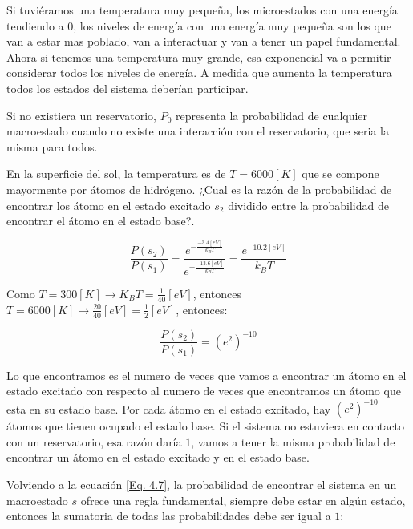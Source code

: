 \documentclass[11pt,fleqn]{book}
\begin{document}
\begin{example}
 Si tuviéramos una temperatura muy pequeña, los microestados con una energía tendiendo a $0$, los niveles de energía con una energía muy pequeña son los que van a estar mas poblado, van a interactuar y van a tener un papel fundamental. Ahora si tenemos una temperatura muy grande, esa exponencial va a permitir considerar todos los niveles de energía. A medida que aumenta la temperatura todos los estados del sistema deberían participar.
\end{example}

Si no existiera un reservatorio, $P_{0}$ representa la probabilidad de cualquier macroestado cuando no existe una interacción con el reservatorio, que seria la misma para todos. 

\begin{example}

En la superficie del sol, la temperatura es de $T=6000[K]$ que se compone mayormente por átomos de hidrógeno. ¿Cual es la razón de la probabilidad de encontrar los átomo en el estado excitado $s_{2}$ dividido entre la probabilidad de encontrar el átomo en el estado base?.

\begin{equation*}
    \frac{P(s_{2})}{P(s_{1})}=\frac{e^{-\frac{-3.4 [eV]}{k_{B}T}}}{e^{-\frac{-13.6 [eV]}{k_{B}T}}}=\frac{e^{-10.2 [eV]}}{k_{B}T}
\end{equation*}

Como $T=300[K]\longrightarrow K_{B}T=\frac{1}{40}[eV]$, entonces $T=6000 [K]\longrightarrow\frac{20}{40}[eV]=\frac{1}{2}[eV]$, entonces:

\begin{equation*}
    \frac{P(s_{2})}{P(s_{1})}=(e^{2})^{-10}
\end{equation*}

Lo que encontramos es el numero de veces que vamos a encontrar un átomo en el estado excitado con respecto al numero de veces que encontramos un átomo que esta en su estado base. Por cada átomo en el estado excitado, hay $(e^{2})^{-10}$ átomos que tienen ocupado el estado base. Si el sistema no estuviera en contacto con un reservatorio, esa razón daría $1$, vamos a tener la misma probabilidad de encontrar un átomo en el estado excitado y en el estado base.
\end{example}

Volviendo a la ecuación \ref{Eq. 4.7}, la probabilidad de encontrar el sistema en un macroestado $s$ ofrece una regla fundamental, siempre debe estar en algún estado, entonces la sumatoria de todas las probabilidades debe ser igual a $1$:
\end{document}
